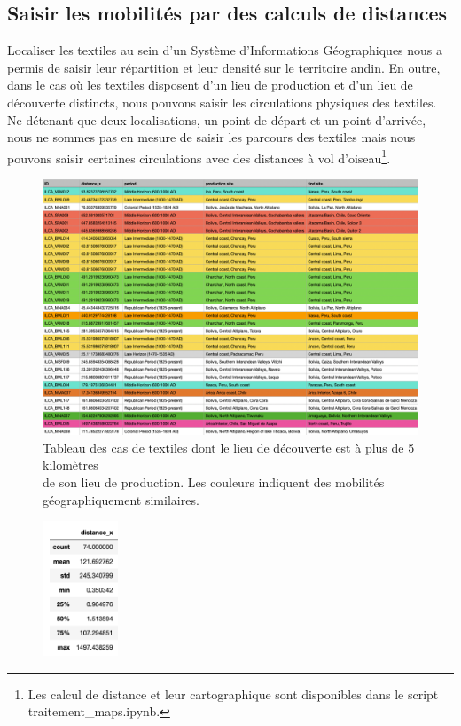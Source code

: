 \subsection{Saisir les mobilités par des calculs de distances}

Localiser les textiles au sein d'un Système d'Informations Géographiques nous a permis de saisir leur répartition et leur densité sur le territoire andin. En outre, dans le cas où les textiles disposent d'un lieu de production et d'un lieu de découverte distincts, nous pouvons saisir les circulations physiques des textiles. Ne détenant que deux localisations, un point de départ et un point d'arrivée, nous ne sommes pas en mesure de saisir les parcours des textiles mais nous pouvons saisir certaines circulations avec des distances à vol d'oiseau\footnote{Les calcul de distance et leur cartographique sont disponibles dans le script traitement\_maps.ipynb.}.

\begin{figure}[!h]
	\begin{center}
		\includegraphics[width=16cm]{../images/tabDistance.png}
		\caption{Tableau des cas de textiles dont le lieu de découverte est à plus de 5 kilomètres \\ de son lieu de production. Les couleurs indiquent des mobilités géographiquement similaires.}
		\label{fig:distancetab}
	 \end{center}
\end{figure}

\clearpage

\begin{figure}
    \centering
    \includegraphics[width=0.2\textwidth]{../images/stat_distance.png}
    \label{fig:distance}
\end{figure}

